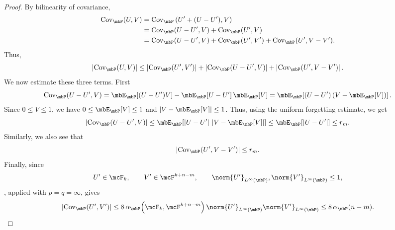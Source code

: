 \documentclass[a4paper]{article}
\numberwithin{equation}{section}   %
\theoremstyle{plain}   %
\theoremstyle{plain}   %
\theoremstyle{examplestyle}
\DeclareMathOperator{\pr}{\mbP}           %
\begin{document}
\begin{proof}
            By bilinearity of covariance,
            \begin{align*}
                \mathrm{Cov}_{\pr}(U,V)
                &=
                \mathrm{Cov}_{\pr}\left(U'+(U-U'),V\right)\\
                &=
                \mathrm{Cov}_{\pr}(U-U',V)
                +
                \mathrm{Cov}_{\pr}(U',V)\\
                &=
                \mathrm{Cov}_{\pr}(U-U',V)
                +
                \mathrm{Cov}_{\pr}(U',V')
                +
                \mathrm{Cov}_{\pr}(U',V-V').
                \end{align*}
            Thus,
            \[
                \left|\mathrm{Cov}_{\pr}(U,V)\right|
                \le
                \left|\mathrm{Cov}_{\pr}(U',V')\right|
                +
                \left|\mathrm{Cov}_{\pr}(U-U',V)\right|
                +
                \left|\mathrm{Cov}_{\pr}(U',V-V')\right|.
            \] 
            We now estimate these three terms. 
            First 
            \[
                \mathrm{Cov}_{\pr}(U-U',V)
                =
                \mbE_{\pr}\!\left[(U-U')V\right]
                -
                \mbE_{\pr}\!\left[U-U'\right]
                \mbE_{\pr}\!\left[V\right]
                =
                \mbE_{\pr}\!\left[
                    (U-U')\left(V-\mbE_{\pr}[V]\right)
                \right].
            \]
            Since \(0\le V\le1\), we have \( 0\le\mbE_{\pr}[V]\le1\) and \(\left|V-\mbE_{\pr}[V]\right|\le1\).
            Thus, using the uniform forgetting estimate, we get
            \begin{equation*}
                \left|
                    \mathrm{Cov}_{\pr}(U-U',V)
                \right|
                \le
                \mbE_{\pr}\!\left[
                    |U-U'|\,
                    \left|V-\mbE_{\pr}[V]\right|
                \right]
                \le
                \mbE_{\pr}[|U-U'|]
                \le r_m.
            \end{equation*}
            Similarly, we also see that 
            \[
                |\mathrm{Cov}_{\pr}(U',V-V')| \le r_m.
            \]
            Finally, since
            \[
                U'\in\mcF_k,
                \qquad
                V'\in\mcF^{k+n-m},
                \qquad
                \norm{U'}_{L^\infty(\pr)},
                \norm{V'}_{L^\infty(\pr)}
                \le1,
            \]
            , applied with \(p=q=\infty\), gives
            \begin{align*}
                \left|\mathrm{Cov}_{\pr}(U',V')\right|
                \le
                8\,
                \alpha_{\pr}\!\left(\mcF_k,\mcF^{k+n-m}\right)
                \norm{U'}_{L^\infty(\pr)}
                \norm{V'}_{L^\infty(\pr)}
                \le
                8\,\alpha_{\pr}(n-m).
            \end{align*}
            

\end{proof}
\end{document}
